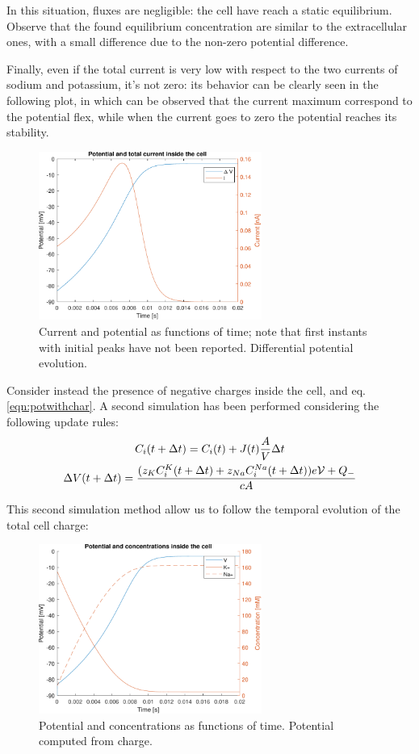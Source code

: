 \documentclass[11pt,a4 paper]{article}
\let\oldfrac\frac
\renewcommand{\frac}[3][d]{\ifthenelse{\equal{#1}{d}}{\oldfrac{#2}{#3}}{\nicefrac{#2}{#3}}}
\begin{document}
In this situation, fluxes are negligible: the cell have reach a static equilibrium. Observe that the found equilibrium concentration are similar to the extracellular ones, with a small difference due to the non-zero potential difference. 

Finally, even if the total current is very low with respect to the two currents of sodium and potassium, it's not zero: its behavior can be clearly seen in the following plot, in which can be observed that the current maximum correspond to the potential flex, while when the current goes to zero the potential reaches its stability.
\begin{figure}[H]
    \centering
    \includegraphics[width=0.65\textwidth]{potcurr_diffpot.pdf}
    \caption{Current and potential as functions of time; note that first instants with initial peaks have not been reported. Differential potential evolution.}
    \label{fig:potcurr_diffpot}
\end{figure}

\bigskip
Consider instead the presence of negative charges inside the cell, and eq. \eqref{eqn:potwithchar}. A second simulation has been performed considering the following update rules:
\begin{gather*}
    C_i(t+\Delta t) = C_i(t) + J(t) \frac{A}{V} \Delta t \\
    \Delta V(t+\Delta t) =  \frac{(z_KC_i^K(t+\Delta t) + z_{Na}C_i^{Na}(t+\Delta t))e\mathcal{V} + Q_-}{cA}
\end{gather*}

This second simulation method allow us to follow the temporal evolution of the total cell charge:

\begin{figure}[H]
    \centering
    \includegraphics[width=0.65\textwidth]{potential_chargepot.pdf}
    \caption{Potential and concentrations as functions of time. Potential computed from charge.}
    \label{fig:potential_chargepot}
\end{figure}
\end{document}
